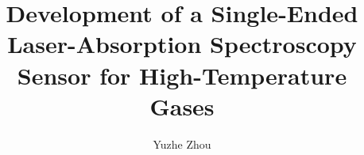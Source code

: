 \documentclass[ece,thesis]{puthesis}
\title{Development of a Single-Ended Laser-Absorption Spectroscopy Sensor for High-Temperature Gases}
\author{Yuzhe Zhou}{Zhou, Yuzhe}
\begin{document}
\volume







%








\appendix


%
%
%
%


%
\end{document}
